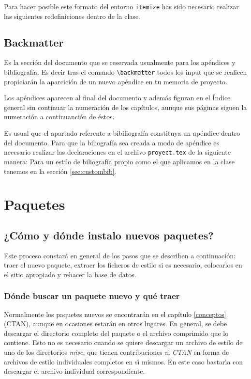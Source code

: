 Para hacer posible este formato del entorno \verb|itemize| has sido necesario realizar las siguientes redefiniciones dentro de la clase.

	\subsection{Backmatter}
Es la sección del documento que se reservada usualmente para los apéndices y bibliografía. Es decir tras el comando \verb|\backmatter|  todos los input que se realicen propiciarán la aparcición de un nuevo apéndice en tu memoria de proyecto.

Los apéndices aparecen al final del documento y además figuran en el Índice general sin continuar la numeración de los capítulos, aunque sus páginas siguen la numeración a continuanción de éstos.

Es usual que el apartado referente a bibiliografía constituya un apéndice dentro del documento. Para que la biliografía sea creada a modo de apéndice es necesario realizar las declaraciones en el archivo \verb|proyect.tex| de la siguiente manera:
 Para un estilo de biliografía propio como el que aplicamos en la clase tenemos en la sección \ref{sec:custombib}.

\section{Paquetes}\label{sec:paquete}
	\subsection{¿C\'omo y d\'onde instalo nuevos paquetes?}

	Este proceso constar\'a en general de los pasos que se describen a continuaci\'on:
	traer el nuevo paquete, extraer los ficheros de estilo si es necesario,
	colocarlos en el sitio apropiado y rehacer la base de datos.

	\subsubsection{D\'onde buscar un paquete nuevo y qu\'e traer}

	Normalmente los paquetes nuevos se encontrar\'an en el capítulo
	\ref{conceptos} {(CTAN)}, aunque en ocasiones estar\'an en otros
	lugares. En general, se debe descargar el directorio completo del paquete o el
	archivo comprimido que lo contiene. Esto no es necesario cuando se quiere
	descargar un archivo de estilo de uno de los directorios {\itshape misc\/}, que tienen
	contribuciones al {\itshape CTAN\/} en forma de archivos de estilo individuales
	completos en s\'\i{} mismos. En este caso bastar\'\i{}a con descargar el archivo
	individual correspondiente.

